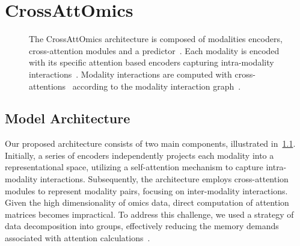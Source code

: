 \documentclass[../main.tex]{subfiles}
\begin{document}
\chapter{CrossAttOmics}\label{chap:crossattomics}
\minitocpage

\begin{figure}[htbp]
    \begin{subcaptiongroup}
        \ifSubfilesClassLoaded{%
        }{
        }
        \label{fig:crossattomics_A}
        \label{fig:crossattomics_B}
        \label{fig:crossattomics_C}
        \label{fig:crossattomics_D}
    \end{subcaptiongroup}

    \caption{The CrossAttOmics architecture is composed of modalities encoders, cross-attention modules and a predictor~. Each modality is encoded with its specific attention based encoders capturing intra-modality interactions~. Modality interactions are computed with cross-attentions~ according to the modality interaction graph~.}
    \label{fig:crossattomics_arch}
\end{figure}

\section{Model Architecture}
 Our proposed architecture consists of two main components, illustrated in~\cref{fig:crossattomics_arch}.
 Initially, a series of encoders independently projects each modality into a representational space, utilizing a self-attention mechanism to capture intra-modality interactions.
 Subsequently, the architecture employs cross-attention modules to represent modality pairs, focusing on inter-modality interactions.
 Given the high dimensionality of omics data, direct computation of attention matrices becomes impractical.
 To address this challenge, we used a strategy of data decomposition into groups, effectively reducing the memory demands associated with attention calculations~\cite{AttOmics}.
\end{document}
